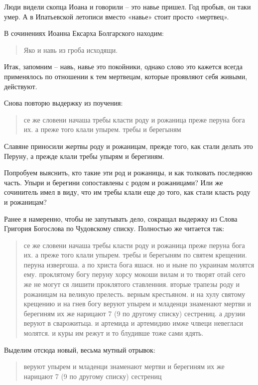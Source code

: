 \documentclass[a5paper,11pt,openany]{article}
\begin{document}
Люди видели скопца Иоана и говорили – это навье пришел. Год пробыв, он таки умер. А в Ипатьевской летописи вместо «навье» стоит просто «мертвец». 

В сочинениях Иоанна Ексарха Болгарского находим:

\begin{quotation}
\noindent Яко и навь из гроба исходящи.
\end{quotation}

    Итак, запомним – навь, навье это покойники, однако слово это кажется всегда применялось по отношении к тем мертвецам, которые проявляют себя живыми, действуют.

   Снова повторю выдержку из поучения:

\begin{quotation}
\noindent се же словени начаша требы класти роду и рожаница преже перуна бога их. а преже того клали упырем. требы и берегыням
\end{quotation}

   Славяне приносили жертвы роду и рожаницам, прежде того, как стали делать это Перуну, а прежде клали требы упырям и берегиням. 

   Попробуем выяснить, кто такие эти род и рожаницы, и как толковать последнюю часть. Упыри и берегини сопоставлены с родом и рожаницами? Или же сочинитель имел в виду, что им требы клали еще до того, как стали класть роду и рожаницам?

   Ранее я намеренно, чтобы не запутывать дело, сокращал выдержку из Слова Григория Богослова по Чудовскому списку. Полностью же читается так:

\begin{quotation}
\noindent се же словени начаша требы класти роду и рожаница преже перуна бога их. а преже того клали упырем. требы и берегыням по святем крещении. перуна извергоша. а по христа бога яшася. но и ныне по украинам молятся ему. проклятому богу перуну хорсу мокоши вилам и то творят отай сего же не могут ся лишити проклятого ставленния. вторые трапезы роду и рожаницам на великую прелесть. верным крестьяном. и на хулу святому крещению и на гнев богу веруют упырем и младенци знаменают мертви и берегиням их же нарицают 7 (9 по другому списку) сестрениц. а друзии веруют в сварожитьца. и артемида и артемидию имже члвеци невегласи молятся. и куры им режут и то блудивше тоже сами ядять.
\end{quotation}

Выделим отсюда новый, весьма мутный отрывок:

\begin{quotation}
\noindent веруют упырем и младенци знаменают мертви и берегиням их же нарицают 7 (9 по другому списку) сестрениц
\end{quotation}
\end{document}
